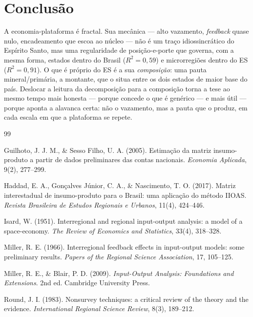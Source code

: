 \documentclass[11pt,a4paper]{article}
\begin{document}
\section{Conclusão}
\label{sec:conclusao}
A economia-plataforma é fractal. Sua mecânica --- alto vazamento, \emph{feedback}
quase nulo, encadeamento que escoa ao núcleo --- não é um traço idiossincrático do
Espírito Santo, mas uma regularidade de posição-e-porte que governa, com a mesma
forma, estados dentro do Brasil ($R^2=0{,}59$) e microrregiões dentro do ES
($R^2=0{,}91$). O que é próprio do ES é a sua \emph{composição}: uma pauta
mineral/primária, a montante, que o situa entre os dois estados de maior base do
país. Deslocar a leitura da decomposição para a composição torna a tese ao mesmo
tempo mais honesta --- porque concede o que é genérico --- e mais útil --- porque
aponta a alavanca certa: não o vazamento, mas a pauta que o produz, em cada escala
em que a plataforma se repete.

\begin{thebibliography}{99}

Guilhoto, J. J. M., \& Sesso Filho, U. A. (2005). Estimação da matriz
insumo-produto a partir de dados preliminares das contas nacionais.
\textit{Economia Aplicada}, 9(2), 277--299.

Haddad, E. A., Gonçalves Júnior, C. A., \& Nascimento, T. O. (2017).
Matriz interestadual de insumo-produto para o Brasil: uma aplicação do método
IIOAS. \textit{Revista Brasileira de Estudos Regionais e Urbanos}, 11(4),
424--446.

Isard, W. (1951). Interregional and regional input-output analysis: a model
of a space-economy. \textit{The Review of Economics and Statistics}, 33(4),
318--328.

Miller, R. E. (1966). Interregional feedback effects in input-output models: some
preliminary results. \textit{Papers of the Regional Science Association}, 17, 105--125.

Miller, R. E., \& Blair, P. D. (2009). \textit{Input-Output Analysis:
Foundations and Extensions}. 2nd ed. Cambridge University Press.

Round, J. I. (1983). Nonsurvey techniques: a critical review of the theory and the
evidence. \textit{International Regional Science Review}, 8(3), 189--212.

\end{thebibliography}
\end{document}
